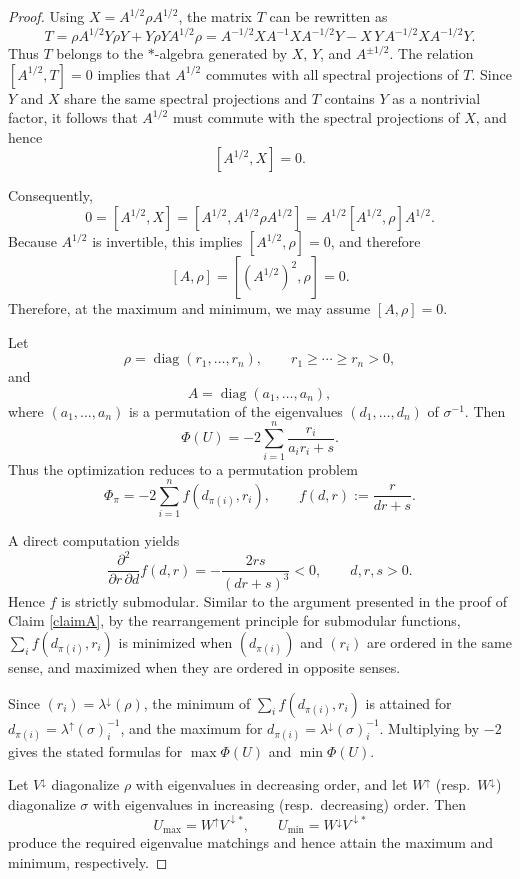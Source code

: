 \documentclass[10pt,a4paper]{amsart}
\begin{document}
\begin{proof}
Using $X=A^{1/2}\rho A^{1/2}$, the matrix $T$ can be rewritten as
\[
T
=
\rho A^{1/2}Y\rho Y+Y\rho Y A^{1/2}\rho
=
A^{-1/2}X A^{-1} X A^{-1/2}Y
-
X\,Y\,A^{-1/2}X A^{-1/2}Y.
\]
Thus $T$ belongs to the $\ast$-algebra generated by $X$, $Y$, and $A^{\pm 1/2}$.
The relation $[A^{1/2},T]=0$ implies that $A^{1/2}$ commutes with all spectral
projections of $T$. Since $Y$ and $X$ share the same spectral projections and
$T$ contains $Y$ as a nontrivial factor, it follows that $A^{1/2}$ must commute
with the spectral projections of $X$, and hence
\[
[A^{1/2},X]=0.
\]

Consequently,
\[
0=[A^{1/2},X]
=[A^{1/2},A^{1/2}\rho A^{1/2}]
=A^{1/2}[A^{1/2},\rho]A^{1/2}.
\]
Because $A^{1/2}$ is invertible, this implies $[A^{1/2},\rho]=0$, and therefore
\[
[A,\rho]=[(A^{1/2})^2,\rho]=0.
\]
Therefore, at the maximum and minimum, we may assume $[A, \rho] = 0$.


Let
\[
\rho=\operatorname{diag}(r_1,\dots,r_n),
\qquad
r_1\ge\cdots\ge r_n>0,
\]
and
\[
A=\operatorname{diag}(a_1,\dots,a_n),
\]
where $(a_1,\dots,a_n)$ is a permutation of the eigenvalues
$(d_1,\dots,d_n)$ of $\sigma^{-1}$.
Then
\[
\Phi(U)
=
-2\sum_{i=1}^n \frac{r_i}{a_i r_i+s}.
\]
Thus the optimization reduces to a permutation problem
\[
\Phi_\pi
=
-2\sum_{i=1}^n f(d_{\pi(i)},r_i),
\qquad
f(d,r):=\frac{r}{dr+s}.
\]

A direct computation yields
\[
\frac{\partial^2}{\partial r\,\partial d}f(d,r)
=
-\frac{2rs}{(dr+s)^3}<0,
\qquad d,r,s>0.
\]
Hence $f$ is strictly submodular.  Similar to the argument presented in the proof of Claim \ref{claimA}, by the rearrangement principle for submodular functions, $\sum_i f(d_{\pi(i)},r_i)$ is minimized when
$(d_{\pi(i)})$ and $(r_i)$ are ordered in the same sense, and maximized when they
are ordered in opposite senses.

Since $(r_i)=\lambda^\downarrow(\rho)$, the minimum of $\sum_i f(d_{\pi(i)},r_i)$ is attained for
$d_{\pi(i)}=\lambda^\uparrow(\sigma)^{-1}_i$, and the maximum for
$d_{\pi(i)}=\lambda^\downarrow(\sigma)^{-1}_i$.
Multiplying by $-2$ gives the stated formulas for
$\max\Phi(U)$ and $\min\Phi(U)$.

Let $V^\downarrow$ diagonalize $\rho$ with eigenvalues in decreasing order,
and let $W^\uparrow$ (resp.\ $W^\downarrow$) diagonalize $\sigma$ with eigenvalues
in increasing (resp.\ decreasing) order.
Then
\[
U_{\max}=W^\uparrow V^{\downarrow *},
\qquad
U_{\min}=W^\downarrow V^{\downarrow *}
\]
produce the required eigenvalue matchings and hence attain the maximum and minimum,
respectively.
\end{proof}
\end{document}
